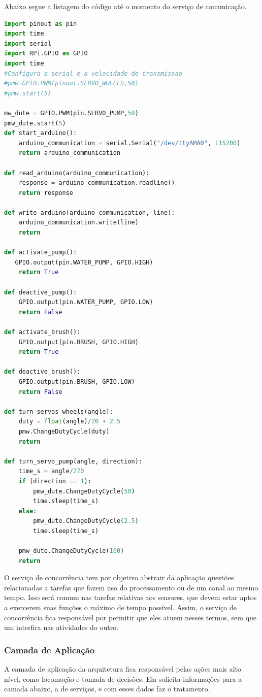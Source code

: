 Abaixo segue a listagem do código até o momento do serviço de comunicação.
\begin{lstlisting}[language=Python, label=services, caption=Código da Camada de Serviços]
import pinout as pin
import time
import serial
import RPi.GPIO as GPIO
import time 
#Configura a serial e a velocidade de transmissao
#pmw=GPIO.PWM(pinout.SERVO_WHEELS,50)
#pmw.start(5)

mw_dute = GPIO.PWM(pin.SERVO_PUMP,50)
pmw_dute.start(5) 
def start_arduino():
    arduino_communication = serial.Serial("/dev/ttyAMA0", 115200)
    return arduino_communication

def read_arduino(arduino_communication):
    response = arduino_communication.readline()
    return response     

def write_arduino(arduino_communication, line):
    arduino_communication.write(line)
    return

def activate_pump():
   GPIO.output(pin.WATER_PUMP, GPIO.HIGH)
    return True

def deactive_pump():
    GPIO.output(pin.WATER_PUMP, GPIO.LOW)
    return False

def activate_brush():
    GPIO.output(pin.BRUSH, GPIO.HIGH)
    return True

def deactive_brush():
    GPIO.output(pin.BRUSH, GPIO.LOW)
    return False

def turn_servos_wheels(angle):
    duty = float(angle)/20 + 2.5
    pmw.ChangeDutyCycle(duty)      
    return

def turn_servo_pump(angle, direction):
    time_s = angle/270
    if (direction == 1):
        pmw_dute.ChangeDutyCycle(50)
        time.sleep(time_s)  
    else:
        pmw_dute.ChangeDutyCycle(2.5)   
        time.sleep(time_s)

    pmw_dute.ChangeDutyCycle(100) 
    return
\end{lstlisting}

O serviço de concorrência tem por objetivo abstrair da aplicação questões relacionadas a tarefas que fazem uso do processamento ou de um canal ao mesmo tempo. Isso será comum nas tarefas relativas aos sensores, que devem estar aptos a exercerem suas funções o máximo de tempo possível. Assim, o serviço de concorrência fica responsável por permitir que eles atuem nesses termos, sem que um interfira nas atividades do outro.

\subsubsection{Camada de Aplicação}
A camada de aplicação da arquitetura fica responsável pelas ações mais alto nível, como locomoção e tomada de decisões. Ela solicita informações para a camada abaixo, a de serviços, e com esses dados faz o tratamento.

